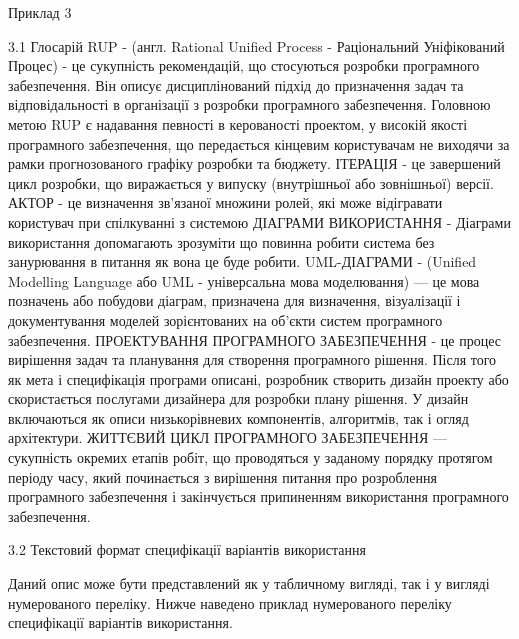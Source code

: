 Приклад 3

3.1 Глосарій 
	RUP - (англ. Rational Unified Process - Раціональний Уніфікований Процес) - це сукупність рекомендацій, що стосуються розробки програмного забезпечення. Він описує дисциплінований підхід до призначення задач та відповідальності в організації з розробки програмного забезпечення. 
	Головною метою RUP є надавання певності в керованості проектом, у високій якості програмного забезпечення, що передається кінцевим користувачам не виходячи за рамки прогнозованого графіку розробки та бюджету. 
	ІТЕРАЦІЯ - це завершений цикл розробки, що виражається у випуску (внутрішньої або зовнішньої) версії. 
	АКТОР - це визначення зв'язаної множини ролей, які може відігравати користувач при спілкуванні з системою 
	ДІАГРАМИ ВИКОРИСТАННЯ - Діаграми використання допомагають зрозуміти що повинна робити система без занурювання в питання як вона це буде робити. 
	UML-ДІАГРАМИ - (Unified Modelling Language або UML - універсальна мова моделювання) — це мова позначень або побудови діаграм, призначена для визначення, візуалізації і документування моделей зорієнтованих на об’єкти систем програмного забезпечення. 
	ПРОЕКТУВАННЯ ПРОГРАМНОГО ЗАБЕЗПЕЧЕННЯ - це процес вирішення задач та планування для створення програмного рішення. Після того як мета і специфікація програми описані, розробник створить дизайн проекту або скористається послугами дизайнера для розробки плану рішення. У дизайн включаються як описи низькорівневих компонентів, алгоритмів, так і огляд архітектури. 
	ЖИТТЄВИЙ ЦИКЛ ПРОГРАМНОГО ЗАБЕЗПЕЧЕННЯ — сукупність окремих етапів робіт, що проводяться у заданому порядку протягом періоду часу, який починається з вирішення питання про розроблення програмного забезпечення і закінчується припиненням використання програмного забезпечення. 
		
3.2  Текстовий формат специфікації варіантів використання
	
Даний опис може бути представлений як у табличному вигляді, так і у вигляді нумерованого переліку. Нижче наведено приклад нумерованого переліку специфікації варіантів використання. 


